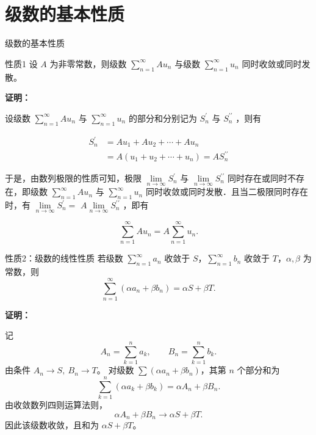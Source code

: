 \documentclass[aspectratio=169,10pt]{ctexbeamer}
\begin{document}
\section{级数的基本性质}
\small
\begin{frame}{级数的基本性质}
	\begin{block}{性质1}
		设 $A$ 为非零常数，则级数 $\sum\limits_{n = 1}^{  \infty } A u_n$ 与级数 $\sum\limits_{n = 1}^{  \infty } u_n$ 同时收敛或同时发散。
	\end{block}
	
	\textbf{证明：}
	
	设级数 $\sum\limits_{n = 1}^{  \infty } A u_n$ 与 $\sum\limits_{n = 1}^{  \infty } u_n$ 的部分和分别记为 $S_n^{\prime}$ 与 $S_n^{\prime \prime}$ ，则有
	
	$$
	\begin{aligned}
		S_n^{\prime} & =A u_1+A u_2+\cdots+A u_n \\
		& =A\left(u_1+u_2+\cdots+u_n\right)=A S_n^{\prime \prime}
	\end{aligned}
	$$
	
	于是，由数列极限的性质可知，极限 $\lim \limits_{n \to \infty} S_n^{\prime}$ 与 $\lim \limits_{n \to \infty} S_n^{\prime \prime}$ 同时存在或同时不存在，即级数 $\sum\limits_{n = 1}^{  \infty } A u_n$ 与 $\sum\limits_{n = 1}^{  \infty } u_n$ 同时收敛或同时发散．且当二极限同时存在时，有 $\lim \limits_{n \to \infty} S_n^{\prime}=$ $A \lim \limits_{n \to \infty} S_n^{\prime \prime}$ ，即有
	
	$$
	\sum_{n=1}^{\infty} A u_n=A \sum_{n=1}^{\infty} u_n .
	$$
	
\end{frame}

\begin{frame}
	\begin{block}{性质2：级数的线性性质}
		若级数 \(\sum\limits_{n = 1}^{  \infty } a_n\) 收敛于 \(S\)，\(\sum\limits_{n = 1}^{  \infty } b_n\) 收敛于 \(T\)，\(\alpha, \beta\) 为常数，则
		\[
		\sum_{n=1}^{\infty} (\alpha a_n + \beta b_n) = \alpha S + \beta T.
		\]
	\end{block}
	\textbf{证明：}
	
	记
	\[
	A_n=\sum_{k=1}^{n}a_k,\qquad B_n=\sum_{k=1}^{n}b_k.
	\]
	由条件 $A_n\to S,\ B_n\to T$。 对级数 $\sum(\alpha a_n+\beta b_n)$，其第 $n$ 个部分和为
	\[
	\sum_{k=1}^{n}(\alpha a_k+\beta b_k)=\alpha A_n+\beta B_n.
	\]
	由收敛数列四则运算法则，
	\[
	\alpha A_n+\beta B_n\to \alpha S+\beta T.
	\]
	因此该级数收敛，且和为 $\alpha S+\beta T$。
	
\end{frame}
\end{document}

